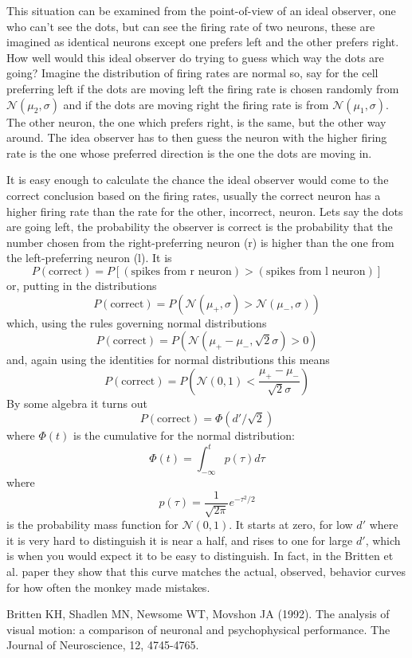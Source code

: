 \documentclass[11pt,a4paper]{scrartcl}
\begin{document}
This situation can be examined from the point-of-view of an ideal
observer, one who can't see the dots, but can see the firing rate of
two neurons, these are imagined as identical neurons except one
prefers left and the other prefers right. How well would this ideal
observer do trying to guess which way the dots are going? Imagine the
distribution of firing rates are normal so, say for the cell
preferring left if the dots are moving left the firing rate is chosen
randomly from $\mathcal{N}(\mu_2,\sigma)$ and if the dots are moving
right the firing rate is from $\mathcal{N}(\mu_1,\sigma)$. The other
neuron, the one which prefers right, is the same, but the other way
around. The idea observer has to then guess the neuron with the higher
firing rate is the one whose preferred direction is the one the dots
are moving in.

It is easy enough to calculate the chance the ideal observer would
come to the correct conclusion based on the firing rates, usually the
correct neuron has a higher firing rate than the rate for the other,
incorrect, neuron. Lets say the dots are going left, the probability
the observer is correct is the probability that the number chosen from
the right-preferring neuron (r) is higher than the one from the left-preferring
neuron (l). It is
\begin{equation}
P(\mbox{correct})=P[(\mbox{spikes from r neuron})>(\mbox{spikes from l neuron})]
\end{equation}
or, putting in the distributions
\begin{equation}
P(\mbox{correct})=P(\mathcal{N}(\mu_+,\sigma)>\mathcal{N}(\mu_-,\sigma))
\end{equation}
which, using the rules governing normal distributions
\begin{equation}
P(\mbox{correct})=P(\mathcal{N}(\mu_+-\mu_-,\sqrt{2}\sigma)>0)
\end{equation}
and, again using the identities for normal distributions this means
\begin{equation}
P(\mbox{correct})=P(\mathcal{N}(0,1)<\frac{\mu_+-\mu_-}{\sqrt{2}\sigma})
\end{equation}
By some algebra it turns out
\begin{equation}
P(\mbox{correct})=\Phi(d'/\sqrt{2})
\end{equation}
where $\Phi(t)$ is the cumulative for the normal distribution:
\begin{equation}
\Phi(t)=\int_{-\infty}^{t}p(\tau)d\tau
\end{equation}
where
\begin{equation}
p(\tau)=\frac{1}{\sqrt{2\pi}}e^{-\tau^2/2}
\end{equation}
is the probability mass function for $\mathcal{N}(0,1)$. It
starts at zero, for low $d'$ where it is very hard to distinguish it is near a half, and rises
to one for large $d'$, which is when you would expect it to be easy to
distinguish. In fact, in the Britten et al. paper
\cite{BrittenEtAl1992} they show that this curve matches the actual,
observed, behavior curves for how often the monkey made mistakes.

\begin{thebibliography}{10}

Britten KH, Shadlen MN, Newsome WT, Movshon JA (1992). The analysis of visual motion: a comparison of neuronal and psychophysical performance. 
\newblock The Journal of Neuroscience, 12, 4745-4765.

\end{thebibliography}
\end{document}
